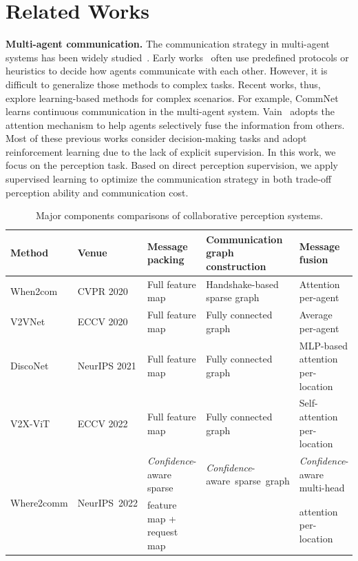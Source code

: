 \vspace{-3mm}
\section{Related Works}\label{related_works}
\vspace{-3mm}

\textbf{Multi-agent communication.}
The communication strategy in multi-agent systems has been widely studied~\cite{singh2018learning}. Early works~\cite{tan1993multi,qureshi2008smart,li2010auction} often use predefined protocols or heuristics to decide how agents communicate with each other. However, it is difficult to generalize those methods to complex tasks. Recent works, thus, explore learning-based methods for complex scenarios. For example, CommNet~\cite{sukhbaatar2016learning} learns continuous communication in the multi-agent system. Vain~\cite{hoshen2017vain} adopts the attention mechanism to help agents selectively fuse the information from others. Most of these previous works consider decision-making tasks and adopt reinforcement learning due to the lack of explicit supervision. In this work, we focus on the perception task. Based on direct perception supervision, we apply supervised learning to optimize the communication strategy in both trade-off perception ability and communication cost. 

\begin{table}[!t]
\centering
\caption{Major components comparisons of collaborative perception systems.}
\setlength\tabcolsep{3pt}
\begin{scriptsize}
\begin{tabular}{lllll}
\hline
Method & Venue &  Message packing & Communication graph construction   & Message fusion \\ \hline
When2com~\cite{when2com}  & CVPR 2020 & Full feature map  &  Handshake-based sparse graph  & Attention per-agent\\
V2VNet~\cite{v2vnet}  & ECCV 2020 & Full feature map & Fully connected graph    & Average per-agent              \\
DiscoNet~\cite{disconet} & NeurIPS 2021 & Full feature map  & Fully connected graph & MLP-based attention per-location  \\
V2X-ViT~\cite{xu2022v2x}  & ECCV 2022 & Full feature map  & Fully connected graph & Self-attention per-location  \\
\hline
\multirow{2}{*}{Where2comm} & \multirow{2}{*}{NeurIPS~2022} &  \emph{Confidence}-aware sparse &\emph{Confidence}-aware~sparse~graph  & \emph{Confidence}-aware multi-head \\ 
&  & feature map  + request map  & & attention per-location
\\ \hline
\end{tabular}
\end{scriptsize}
\label{tab:comparison}
\vspace{-5mm}
\end{table}

